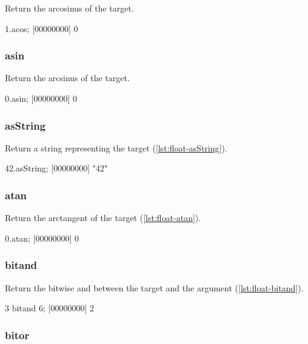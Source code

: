 Return the arcosinus of the target.

\begin{urbiscript}[caption=Float.acos, label=lst:float-acos]
1.acos;
[00000000] 0
\end{urbiscript}

\subsubsection{asin}

Return the arcsinus of the target.

\begin{urbiscript}[caption=Float.asin, label=lst:float-asin]
0.asin;
[00000000] 0
\end{urbiscript}

\subsubsection{asString}

Return a string representing the target (\autoref{lst:float-asString}).

\begin{urbiscript}[caption=Float.asString, label=lst:float-asString]
42.asString;
[00000000] "42"
\end{urbiscript}

\subsubsection{atan}

Return the arctangent of the target (\autoref{lst:float-atan}).

\begin{urbiscript}[caption=Float.atan, label=lst:float-atan]
0.atan;
[00000000] 0
\end{urbiscript}

\subsubsection{bitand}

Return the bitwise and between the target and the argument (\autoref{lst:float-bitand}).

\begin{urbiscript}[caption=Float.bitand, label=lst:float-bitand]
3 bitand 6;
[00000000] 2
\end{urbiscript}

\subsubsection{bitor}

